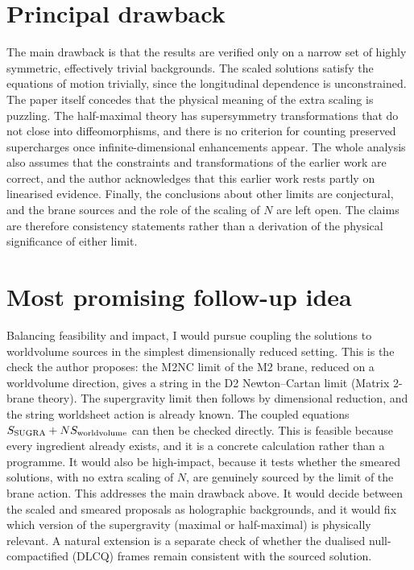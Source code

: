 \documentclass[11pt]{article}
\begin{document}
\section{Principal drawback}
The main drawback is that the results are verified only on a narrow set of highly symmetric, effectively trivial backgrounds. The scaled solutions satisfy the equations of motion trivially, since the longitudinal dependence is unconstrained. The paper itself concedes that the physical meaning of the extra scaling is puzzling. The half-maximal theory has supersymmetry transformations that do not close into diffeomorphisms, and there is no criterion for counting preserved supercharges once infinite-dimensional enhancements appear. The whole analysis also assumes that the constraints and transformations of the earlier work are correct, and the author acknowledges that this earlier work rests partly on linearised evidence. Finally, the conclusions about other limits are conjectural, and the brane sources and the role of the scaling of $N$ are left open. The claims are therefore consistency statements rather than a derivation of the physical significance of either limit.

\section{Most promising follow-up idea}
Balancing feasibility and impact, I would pursue coupling the solutions to worldvolume sources in the simplest dimensionally reduced setting. This is the check the author proposes: the M2NC limit of the M2 brane, reduced on a worldvolume direction, gives a string in the D2 Newton--Cartan limit (Matrix 2-brane theory). The supergravity limit then follows by dimensional reduction, and the string worldsheet action is already known. The coupled equations $S_{\rm SUGRA}+N S_{\rm worldvolume}$ can then be checked directly. This is feasible because every ingredient already exists, and it is a concrete calculation rather than a programme. It would also be high-impact, because it tests whether the smeared solutions, with no extra scaling of $N$, are genuinely sourced by the limit of the brane action. This addresses the main drawback above. It would decide between the scaled and smeared proposals as holographic backgrounds, and it would fix which version of the supergravity (maximal or half-maximal) is physically relevant. A natural extension is a separate check of whether the dualised null-compactified (DLCQ) frames remain consistent with the sourced solution.
\end{document}

